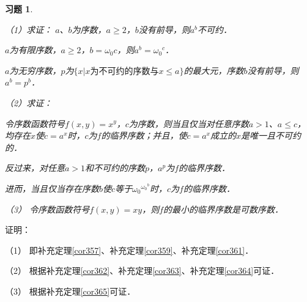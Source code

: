 \documentclass[12pt, a4paper, oneside]{book}
\newtheorem{exer}{习题}
\begin{document}
			\begin{exer}\label{exer169}
				\hfill\par
				（1）求证：
				$a$、$b$为序数，$a\geq 2$，$b$没有前导，则$a^b$不可约．
				\par
				$a$为有限序数，$a\geq 2$，$b=\omega_0c$，则$a^b={\omega_0}^c$．
				\par
				$a$为无穷序数，$p$为$\{x|x\text{为不可约的序数}\text{与}x\leq a\}$的最大元，序数$b$没有前导，则$a^b=p^b$．
				\par
				（2）求证：
				\par
				令序数函数符号$f(x, y)=x^y$，$c$为序数，则当且仅当对任意序数$a>1$、$a\leq c$，均存在$x$使$c=a^x$时，$c$为$f$的临界序数；并且，使$c=a^x$成立的$x$是唯一且不可约的．
				\par
				反过来，对任意$a>1$和不可约的序数$p$，$a^p$为$f$的临界序数．
				\par
				进而，当且仅当存在序数$b$使$c$等于${\omega_0}^{{\omega_0}^b}$时，$c$为$f$的临界序数．
				\par
				（3）	令序数函数符号$f(x, y)=xy$，则$f$的最小的临界序数是可数序数．
			\end{exer}
			证明：
			\par
			（1）	即补充定理\ref{cor357}、补充定理\ref{cor359}、补充定理\ref{cor361}．
			\par
			（2）	根据补充定理\ref{cor362}、补充定理\ref{cor363}、补充定理\ref{cor364}可证．
			\par
			（3）	根据补充定理\ref{cor365}可证．
			
\end{document}
